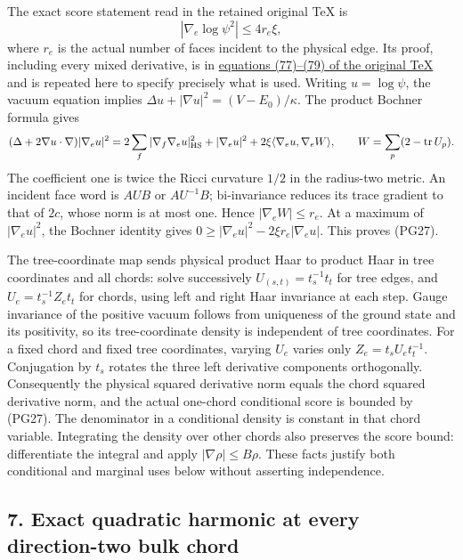 \documentclass[11pt]{article}
\begin{document}
The exact score statement read in the retained original TeX is
\[
 |\nabla_e\log\psi^2|\le4r_e\xi ,
 \tag{PG27}
\]
where \(r_e\) is the actual number of faces incident to the physical
edge. Its proof, including every mixed derivative, is in
\href{https://github.com/KokunoYumeto/yang-mills-interacting-workbench/blob/485b61423c1f4e1805deb453c1b6b342b27842b6/yang-mills/continuations/20260930-s6-ns-moment-map-bridge/sources/spatial/spatial_continuum.tex#L1415}{equations (77)–(79) of the original TeX}
and is repeated here to specify precisely what is used.
Writing \(u=\log\psi\), the vacuum equation implies
\(\Delta u+|\nabla u|^2=(V-E_0)/\kappa\).
The product Bochner formula gives
\[
 (\Delta+2\nabla u\cdot\nabla)|\nabla_eu|^2
 =2\sum_f|\nabla_f\nabla_eu|_{\rm HS}^2+
       |\nabla_eu|^2+2\xi\langle\nabla_eu,\nabla_eW\rangle ,
 \qquad W=\sum_p(2-\operatorname{tr}U_p).
\]
The coefficient one is twice the Ricci curvature \(1/2\) in the
radius-two metric. An incident face word is \(AUB\) or \(AU^{-1}B\);
bi-invariance reduces its trace gradient to that of \(2c\), whose
norm is at most one. Hence \(|\nabla_eW|\le r_e\). At a maximum
of \(|\nabla_eu|^2\), the Bochner identity gives
\(0\ge|\nabla_eu|^2-2\xi r_e|\nabla_eu|\).
This proves (PG27).

The tree-coordinate map sends physical product Haar to product Haar
in tree coordinates and all chords: solve successively
\(U_{(s,t)}=t_s^{-1}t_t\) for tree edges, and
\(U_e=t_s^{-1}Z_et_t\) for chords, using left and right Haar
invariance at each step. Gauge invariance of the positive vacuum
follows from uniqueness of the ground state and its positivity, so its
tree-coordinate density is independent of tree coordinates.
For a fixed chord and fixed tree coordinates, varying \(U_e\) varies
only \(Z_e=t_sU_et_t^{-1}\). Conjugation by \(t_s\) rotates the
three left derivative components orthogonally. Consequently the
physical squared derivative norm equals the chord squared derivative
norm, and the actual one-chord conditional score is bounded by
(PG27). The denominator in a conditional density is constant in that
chord variable. Integrating the density over other chords also preserves
the score bound: differentiate the integral and apply
\(|\nabla\rho|\le B\rho\). These facts justify both conditional and
marginal uses below without asserting independence.

\subsection*{7. Exact quadratic harmonic at every direction-two bulk chord}
\end{document}
